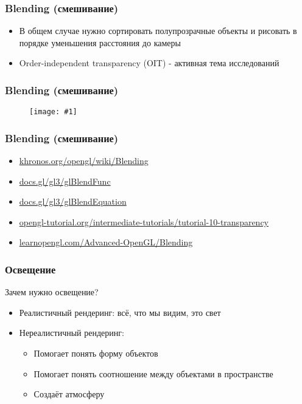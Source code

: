 \documentclass{beamer}
\newcommand{\slideimage}[1]{
  \begin{figure}
    \begin{adjustbox}{width=\textwidth, totalheight=\textheight-2\baselineskip-2\baselineskip,keepaspectratio}
      \texttt{[image: \#1]}
    \end{adjustbox}
  \end{figure}
}
\begin{document}
\begin{frame}[fragile]
\frametitle{Blending (смешивание)}
\begin{itemize}
\item В общем случае нужно сортировать полупрозрачные объекты и рисовать в порядке уменьшения расстояния до камеры
\item Order-independent transparency (OIT) - активная тема исследований
\end{itemize}
\end{frame}

\begin{frame}[fragile]
\frametitle{Blending (смешивание)}
\slideimage{blending_sorted.png}
\end{frame}

\begin{frame}[fragile]
\frametitle{Blending (смешивание)}
\begin{itemize}
\item \href{https://www.khronos.org/opengl/wiki/Blending}{khronos.org/opengl/wiki/Blending}
\item \href{http://docs.gl/gl3/glBlendFunc}{docs.gl/gl3/glBlendFunc}
\item \href{http://docs.gl/gl3/glBlendEquation}{docs.gl/gl3/glBlendEquation}
\item \href{http://www.opengl-tutorial.org/intermediate-tutorials/tutorial-10-transparency/}{opengl-tutorial.org/intermediate-tutorials/tutorial-10-transparency}
\item \href{https://learnopengl.com/Advanced-OpenGL/Blending}{learnopengl.com/Advanced-OpenGL/Blending}
\end{itemize}
\end{frame}

\begin{frame}[fragile]
\frametitle{Освещение}
Зачем нужно освещение?
\begin{itemize}
\item Реалистичный рендеринг: всё, что мы видим, это свет
\pause
\item Нереалистичный рендеринг:
\begin{itemize}
\item Помогает понять форму объектов
\item Помогает понять соотношение между объектами в пространстве
\item Создаёт атмосферу
\end{itemize}
\end{itemize}
\end{frame}
\end{document}
